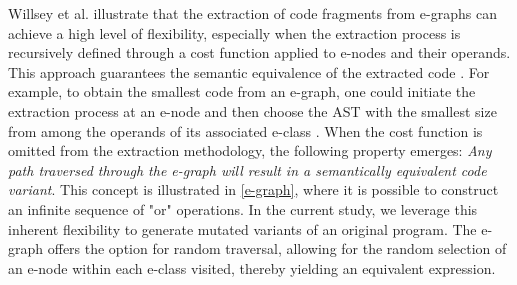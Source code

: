\documentclass[a4paper,fleqn]{cas-dc}
\newcommand*\badge[1]{ \colorbox{red}{\color{white}#1}}
\newcommand{\todo}[1]{%
\refstepcounter{todo}
\noindent\textbf{\badge{TODO}} {\color{red}#1}
\addcontentsline{td}{todo}
{\color{red}\thesection.\thetodo\xspace #1}}
\begin{document}

Willsey et al. illustrate that the extraction of code fragments from e-graphs can achieve a high level of flexibility, especially when the extraction process is recursively defined through a cost function applied to e-nodes and their operands. 
This approach guarantees the semantic equivalence of the extracted code \cite{10.1145/3434304}. 
For example, to obtain the smallest code from an e-graph, one could initiate the extraction process at an e-node and then choose the AST with the smallest size from among the operands of its associated e-class \cite{10.1145/3385412.3386012}.
When the cost function is omitted from the extraction methodology, the following property emerges:
\emph{Any path traversed through the e-graph will result in a semantically equivalent code variant}. 
This concept is illustrated in \autoref{e-graph}, where it is possible to construct an infinite sequence of "or" operations.
In the current study, we leverage this inherent flexibility to generate mutated variants of an original program. 
The e-graph offers the option for random traversal, allowing for the random selection of an e-node within each e-class visited, thereby yielding an equivalent expression.



 
\end{document}
